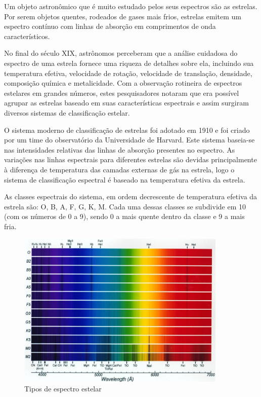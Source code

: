 Um objeto astronômico que é muito estudado pelos seus espectros são as estrelas. Por serem objetos quentes, rodeados de gases mais frios, estrelas emitem um espectro contínuo com linhas de absorção em comprimentos de onda característicos.

No final do século XIX, astrônomos perceberam que a análise cuidadosa do espectro de uma estrela fornece uma riqueza de detalhes sobre ela, incluindo sua temperatura efetiva, velocidade de rotação, velocidade de translação, densidade, composição química e metalicidade. Com a observação rotineira de espectros estelares em grandes números, estes pesquisadores notaram que era possível agrupar as estrelas baseado em suas características espectrais e assim surgiram diversos sistemas de classificação estelar. 

O sistema moderno de classificação de estrelas foi adotado em 1910 e foi criado por um time do observatório da Universidade de Harvard. Este sistema baseia-se nas intensidades relativas das linhas de absorção presentes no espectro. As variações nas linhas espectrais para diferentes estrelas são devidas principalmente à diferença de temperatura das camadas externas de gás na estrela, logo o sistema de classificação espectral é baseado na temperatura efetiva da estrela. 

As classes espectrais do sistema, em ordem decrescente de temperatura efetiva da estrela são: O, B, A, F, G, K, M. Cada uma dessas classes se subdivide em 10 (com os números de 0 a 9), sendo 0 a mais quente dentro da classe e 9 a mais fria.

\begin{figure}[htb]
\centering
\includegraphics[width=10cm]{figuras/Spectra_Briley.jpg}
\caption{Tipos de espectro estelar}
\label{fig:stellar-spectrum-types}
\end{figure}

